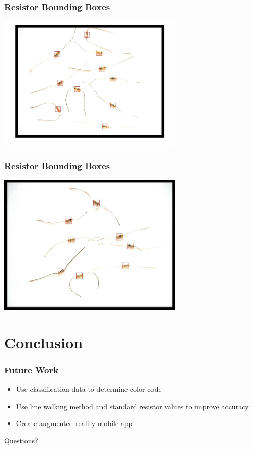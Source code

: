 \documentclass{beamer}
\begin{document}
\begin{frame}
\frametitle{Resistor Bounding Boxes}
\begin{center}
\includegraphics[width=3.5in]{images/example4/bbs.jpg}
\end{center}
\end{frame}



\begin{frame}
\frametitle{Resistor Bounding Boxes}
\begin{center}
\includegraphics[width=3.5in]{images/example5/bbs.jpg}
\end{center}
\end{frame}


\section{Conclusion}

\begin{frame}
\frametitle{Future Work}
    \begin{block}{}
	\begin{itemize}
	\item Use classification data to determine color code
	\item Use line walking method and standard resistor values to improve accuracy
	\item Create augmented reality mobile app
	\end{itemize}
	\end{block}
\end{frame}


\begin{frame}
\Huge{\centerline{Questions?}}
\end{frame}

\end{document}
